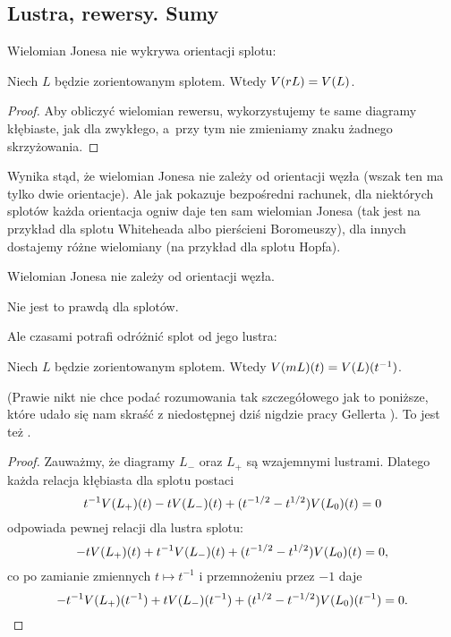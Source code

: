 
\subsection{Lustra, rewersy. Sumy}
Wielomian Jonesa nie wykrywa orientacji splotu:

\begin{proposition}
%
    Niech $L$ będzie zorientowanym splotem.
    Wtedy $V(rL)=V(L)$.
\end{proposition}

\begin{proof}
    Aby obliczyć wielomian rewersu, wykorzystujemy te same diagramy kłębiaste,
    jak dla zwykłego, a~przy tym nie zmieniamy znaku żadnego skrzyżowania.
\end{proof}

Wynika stąd, że wielomian Jonesa nie zależy od orientacji węzła (wszak ten ma tylko dwie orientacje).
Ale jak pokazuje bezpośredni rachunek, dla niektórych splotów każda orientacja ogniw daje ten sam wielomian Jonesa (tak jest na przykład dla splotu Whiteheada albo pierścieni Boromeuszy), dla innych dostajemy różne wielomiany (na przykład dla splotu Hopfa).

\begin{corollary}
    Wielomian Jonesa nie zależy od orientacji węzła.
\end{corollary}

Nie jest to prawdą dla splotów.

Ale czasami potrafi odróżnić splot od jego lustra:

\begin{proposition}
%
    Niech $L$ będzie zorientowanym splotem.
    Wtedy $V(mL)(t)=V(L)(t^{-1})$.
\end{proposition}

(Prawie nikt nie chce podać rozumowania tak szczegółowego jak to poniższe, które udało się nam skraść z niedostępnej dziś nigdzie pracy Gellerta \cite[s. 12]{gellert2009}).
To jest też \cite[fakt 10.4.4]{kawauchi1996}.

\begin{proof}
    Zauważmy, że diagramy $L_-$ oraz $L_+$ są wzajemnymi lustrami.
    Dlatego każda relacja kłębiasta dla splotu postaci
    \begin{equation}
        t^{-1} V(L_+)(t) - tV(L_-)(t) + (t^{-1/2} - t^{1/2}) V(L_0)(t) = 0
    \end{equation}
    odpowiada pewnej relacji dla lustra splotu:
    \begin{equation}
        -tV(L_+)(t) + t^{-1} V(L_-)(t) + (t^{-1/2} - t^{1/2}) V(L_0)(t) = 0,
    \end{equation}
    co po zamianie zmiennych $t \mapsto t^{-1}$ i przemnożeniu przez $-1$ daje
    \begin{equation}
        -t^{-1} V(L_+)(t^{-1}) + t V(L_-)(t^{-1}) + (t^{1/2} - t^{-1/2}) V(L_0)(t^{-1}) = 0.
    \end{equation}
\end{proof}

